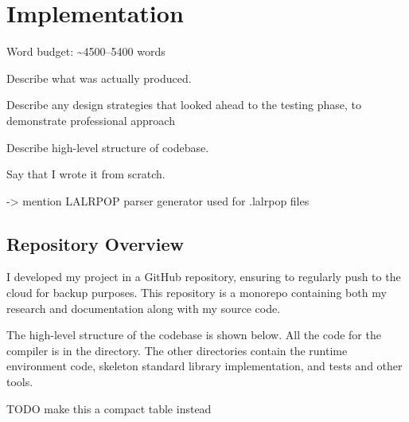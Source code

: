 \documentclass[00-main.tex]{subfiles}
\begin{document}
\chapter{Implementation}

\begin{mrwComment}
Word budget: \textasciitilde 4500--5400 words
\end{mrwComment}

\begin{mrwComment}
Describe what was actually produced.

Describe any design strategies that looked ahead to the testing phase, to demonstrate professional approach
\end{mrwComment}
\begin{mrwComment}
Describe high-level structure of codebase.

Say that I wrote it from scratch.

-> mention LALRPOP parser generator used for .lalrpop files
\end{mrwComment}

\section{Repository Overview}

\newcommand{\DTfile}[1]{\texttt{#1}}
\newcommand{\DTdir}[1]{\textbf{\texttt{#1}}/}

I developed my project in a GitHub repository, ensuring to regularly push to the cloud for backup purposes.
This repository is a monorepo containing both my research and documentation along with my source code.

The high-level structure of the codebase is shown below.
All the code for the compiler is in the  directory.
The other directories contain the runtime environment code, skeleton standard library implementation, and tests and other tools.

\begin{mrwComment}
TODO make this a compact table instead
\end{mrwComment}

\DTsetlength{0.2em}{1em}{0.2em}{0.4pt}{2pt}
\end{document}
